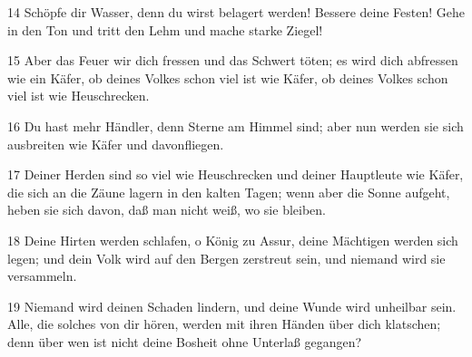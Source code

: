 \par 14 Schöpfe dir Wasser, denn du wirst belagert werden! Bessere deine Festen! Gehe in den Ton und tritt den Lehm und mache starke Ziegel!
\par 15 Aber das Feuer wir dich fressen und das Schwert töten; es wird dich abfressen wie ein Käfer, ob deines Volkes schon viel ist wie Käfer, ob deines Volkes schon viel ist wie Heuschrecken.
\par 16 Du hast mehr Händler, denn Sterne am Himmel sind; aber nun werden sie sich ausbreiten wie Käfer und davonfliegen.
\par 17 Deiner Herden sind so viel wie Heuschrecken und deiner Hauptleute wie Käfer, die sich an die Zäune lagern in den kalten Tagen; wenn aber die Sonne aufgeht, heben sie sich davon, daß man nicht weiß, wo sie bleiben.
\par 18 Deine Hirten werden schlafen, o König zu Assur, deine Mächtigen werden sich legen; und dein Volk wird auf den Bergen zerstreut sein, und niemand wird sie versammeln.
\par 19 Niemand wird deinen Schaden lindern, und deine Wunde wird unheilbar sein. Alle, die solches von dir hören, werden mit ihren Händen über dich klatschen; denn über wen ist nicht deine Bosheit ohne Unterlaß gegangen?


